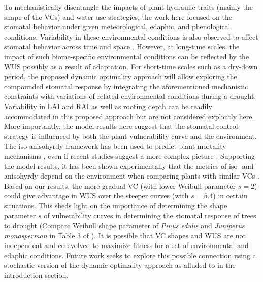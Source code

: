 \documentclass[utf8]{frontiersSCNS} %
\begin{document}
To mechanistically disentangle the impacts of plant hydraulic traits (mainly the shape of the VCs) and water use strategies, the work here focused on the stomatal behavior under given meteorological, edaphic, and phenological conditions. Variability in these environmental conditions is also observed to affect stomatal behavior across time and space \citep{feng2018beyond,novick2019beyond}. However, at long-time scales, the impact of such biome-specific environmental conditions can be reflected by the WUS possibly as a result of adaptation. For short-time scales such as a dry-down period, the proposed dynamic optimality approach will allow exploring the compounded stomatal response by integrating the aforementioned mechanistic constraints with variations of related environmental conditions during a drought. Variability in LAI and RAI as well as rooting depth can be readily accommodated in this proposed approach but are not considered explicitly here. More importantly, the model results here suggest that the stomatal control strategy is influenced by both the plant vulnerability curve and the environment. The iso-anisohyrdy framework has been used to predict plant mortality mechanisms \citep{mcdowell_mechanisms_2008}, even if recent studies suggest a more complex picture \citep{meinzer_dynamics_2014,martinezvilalta_water_2017}. Supporting the model results, it has been shown experimentally that the metrics of iso- and anisohyrdy depend on the environment when comparing plants with similar VCs \citep{hochberg_iso/anisohydry:_2018}.  Based on our results, the more gradual VC (with lower Weibull parameter $s=2$) could give advantage in WUS over the steeper curves (with $s=5.4$) in certain situations. This sheds light on the importance of determining the shape parameter $s$ of vulnerability curves in determining the stomatal response of trees to drought (Compare Weibull shape parameter of \textit{Pinus edulis} and \textit{Juniperus monosperman} in Table 3 of \citet{plaut_hydraulic_2012}). It is possible that VC shapes and WUS are not independent and co-evolved to maximize fitness for a set of environmental and edaphic conditions. Future work seeks to explore this possible connection using a stochastic version of the dynamic optimality approach as alluded to in the introduction section. 
\end{document}
